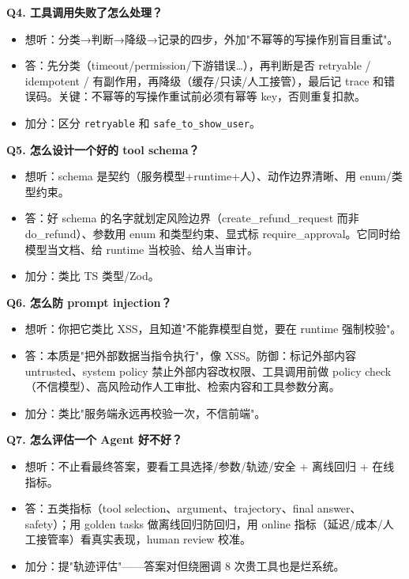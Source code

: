 \textbf{Q4. 工具调用失败了怎么处理？}
\begin{itemize}[leftmargin=2em]
\item 想听：分类→判断→降级→记录的四步，外加"不幂等的写操作别盲目重试"。
\item 答：先分类（timeout/permission/下游错误…），再判断是否 retryable / idempotent / 有副作用，再降级（缓存/只读/人工接管），最后记 trace 和错误码。关键：不幂等的写操作重试前必须有幂等 key，否则重复扣款。
\item 加分：区分 \texttt{retryable} 和 \texttt{safe\_to\_show\_user}。
\end{itemize}

\textbf{Q5. 怎么设计一个好的 tool schema？}
\begin{itemize}[leftmargin=2em]
\item 想听：schema 是契约（服务模型+runtime+人）、动作边界清晰、用 enum/类型约束。
\item 答：好 schema 的名字就划定风险边界（create\_refund\_request 而非 do\_refund）、参数用 enum 和类型约束、显式标 require\_approval。它同时给模型当文档、给 runtime 当校验、给人当审计。
\item 加分：类比 TS 类型/Zod。
\end{itemize}

\textbf{Q6. 怎么防 prompt injection？}
\begin{itemize}[leftmargin=2em]
\item 想听：你把它类比 XSS，且知道"不能靠模型自觉，要在 runtime 强制校验"。
\item 答：本质是"把外部数据当指令执行"，像 XSS。防御：标记外部内容 untrusted、system policy 禁止外部内容改权限、工具调用前做 policy check（不信模型）、高风险动作人工审批、检索内容和工具参数分离。
\item 加分：类比"服务端永远再校验一次，不信前端"。
\end{itemize}

\textbf{Q7. 怎么评估一个 Agent 好不好？}
\begin{itemize}[leftmargin=2em]
\item 想听：不止看最终答案，要看工具选择/参数/轨迹/安全 + 离线回归 + 在线指标。
\item 答：五类指标（tool selection、argument、trajectory、final answer、safety）；用 golden tasks 做离线回归防回归，用 online 指标（延迟/成本/人工接管率）看真实表现，human review 校准。
\item 加分：提"轨迹评估"——答案对但绕圈调 8 次贵工具也是烂系统。
\end{itemize}

